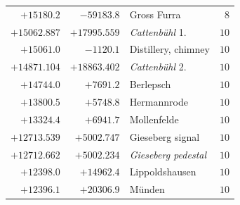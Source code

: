 \begin{center}
\begin{tabular}{r|r|p{170pt}|r}
\(+15180.2\)&\(-59183.8\)&Gross Furra&\(8\)\\
\(+15062.887\)&\(+17995.559\)&\textit{Cattenbühl} 1.&\(10\)\\
\(+15061.0\)&\(-1120.1\)&Distillery, chimney&\(10\)\\
\(+14871.104\)&\(+18863.402\)&\textit{Cattenbühl} 2.&\(10\)\\
\(+14744.0\)&\(+7691.2\)&Berlepsch&\(10\)\\
\(+13800.5\)&\(+5748.8\)&Hermannrode&\(10\)\\
\(+13324.4\)&\(+6941.7\)&Mollenfelde&\(10\)\\
\(+12713.539\)&\(+5002.747\)&Gieseberg signal&\(10\)\\
\(+12712.662\)&\(+5002.234\)&\textit{Gieseberg pedestal}&\(10\)\\
\(+12398.0\)&\(+14962.4\)&Lippoldshausen&\(10\)\\
\(+12396.1\)&\(+20306.9\)&Münden&\(10\)\\
\hline\end{tabular}\endgroup\end{center}
\clearpage
